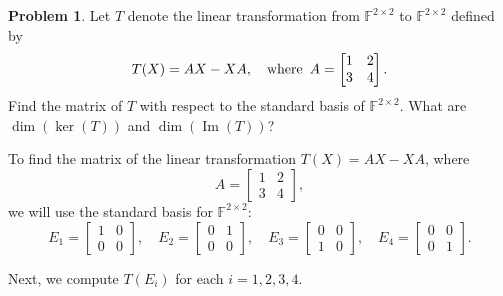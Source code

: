 \documentclass[12pt]{article}
\theoremstyle{definition}
\newtheorem{problem}{Problem}
\DeclareMathOperator{\Ima}{Im}
\begin{document}
\begin{problem}
    Let $T$ denote the linear transformation from $\mathbb{F}^{2 \times 2}$ to $\mathbb{F}^{2 \times 2}$ defined by
    \begin{equation*}
        T(X) = AX - XA, \hspace{10px} \text{where} \hspace{5px} A = 
            \begin{bmatrix}
                1 & 2\\
                3 & 4
            \end{bmatrix}.
    \end{equation*}
    Find the matrix of $T$ with respect to the standard basis of $\mathbb{F}^{2 \times 2}$. What are $\dim{(\ker{(T)})}$ and $\dim{(\Ima{(T)})}$?

    \begin{solution}
        To find the matrix of the linear transformation \( T(X) = AX - XA \), where 
        \[
        A = \begin{bmatrix} 1 & 2 \\ 3 & 4 \end{bmatrix},
        \]
        we will use the standard basis for \( \mathbb{F}^{2 \times 2} \):
        \[
        E_1 = \begin{bmatrix} 1 & 0 \\ 0 & 0 \end{bmatrix}, \quad E_2 = \begin{bmatrix} 0 & 1 \\ 0 & 0 \end{bmatrix}, \quad E_3 = \begin{bmatrix} 0 & 0 \\ 1 & 0 \end{bmatrix}, \quad E_4 = \begin{bmatrix} 0 & 0 \\ 0 & 1 \end{bmatrix}.
        \]

        Next, we compute \( T(E_i) \) for each \( i = 1, 2, 3, 4 \).


\end{solution}
\end{problem}
\end{document}
